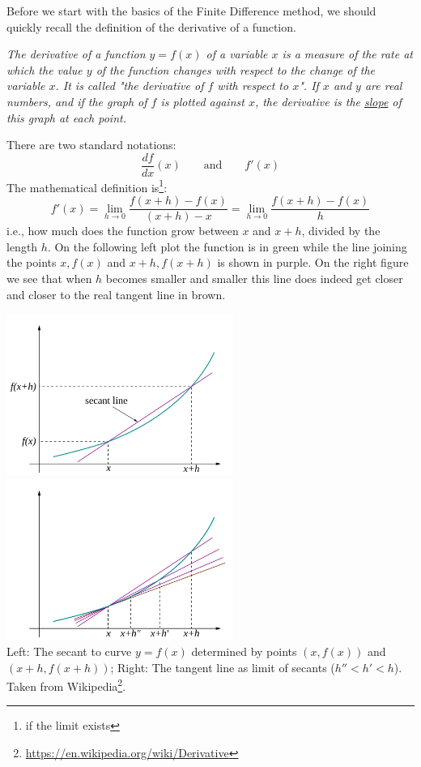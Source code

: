 Before we start with the basics of the Finite Difference method, we should quickly recall the definition 
of the derivative of a function. 

\begin{center}
{\sl 
The derivative of a function $y=f(x)$ of a variable $x$ is a measure of the rate at which the value $y$ 
of the function changes with respect to the change of the variable $x$. It is called "the derivative of $f$ 
with respect to $x$". If $x$ and $y$ are real numbers, and if the graph of $f$ is plotted against $x$, the derivative 
is the \underline{slope} of this graph at each point. 
}
\end{center}

\noindent There are two standard notations:
\[
\frac{df}{dx}(x) \qquad \text{and} \qquad f'(x)
\]
The mathematical definition is\footnote{if the limit exists}:
\[
\boxed{
f'(x)
=\lim_{h\rightarrow 0} \frac{f(x+h)-f(x)}{(x+h)-x} 
=\lim_{h\rightarrow 0} \frac{f(x+h)-f(x)}{h} 
}
\]
i.e., how much does the function grow between $x$ and $x+h$, divided by the length $h$.
On the following left plot the function is in green while the line joining the points
$x,f(x)$ and $x+h,f(x+h)$ is shown in purple. On the right figure we see that 
when $h$ becomes smaller and smaller this line does indeed get closer and closer 
to the real tangent line in brown.

\begin{center}
\includegraphics[width=7.4cm]{images/derivative/der2}
\includegraphics[width=7.4cm]{images/derivative/der1}\\
{\captionfont 
Left: The secant to curve $y=f(x)$ determined by points $(x,f(x))$ and $(x+h, f(x+h))$;
Right: The tangent line as limit of secants ($h''<h'<h$).
Taken from Wikipedia\footnote{\url{https://en.wikipedia.org/wiki/Derivative}}.
}
\end{center}


